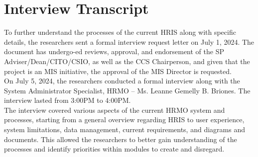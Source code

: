 \chapter{Interview Transcript}

To further understand the processes of the current HRIS along with specific details, the researchers sent a formal interview request letter on July 1, 2024. The document has undergo-ed reviews, approval, and endorsement of the SP Adviser/Dean/CITO/CSIO, as well as the CCS Chairperson, and given that the project is an MIS initiative, the approval of the MIS Director is requested.
\\

On July 5, 2024, the researchers conducted a formal interview along with the System Administrator Specialist, HRMO -- Ms. Leanne Gemelly B. Briones. The interview lasted from 3:00PM to 4:00PM.
\\

The interview covered various aspects of the current HRMO system and processes, starting from a general overview regarding HRIS to user experience, system limitations, data management, current requirements, and diagrams and documents. This allowed the researchers to better gain understanding of the processes and identify priorities within modules to create and disregard.

